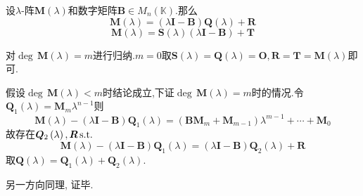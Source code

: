\begin{green}
\begin{lemma}[带余除法]\label{lem:矩阵多项式的带余除法}
    设$\lambda$-阵$\bm{M}\left(\lambda\right)$和数字矩阵$\bm{B}\in M_n\left(\mathbb{K}\right)$.那么
    \[
    \bm{M}\left(\lambda\right)=\left(\lambda\bm{I}-\bm{B}\right)\bm{Q}\left(\lambda\right)+\bm{R}
    \]
    \[
    \bm{M}\left(\lambda\right)=\bm{S}\left(\lambda\right)\left(\lambda\bm{I}-\bm{B}\right)+\bm{T}
    \]
\end{lemma}
\begin{Proof}
对$\deg\,\bm{M}\left(\lambda\right)=m$进行归纳.$m=0$取$\bm{S}\left(\lambda\right)=\bm{Q}\left(\lambda\right)=\bm{O},\bm{R}=\bm{T}=\bm{M}\left(\lambda\right)$即可.

假设$\deg\,\bm{M}\left(\lambda\right)<m$时结论成立,下证$\deg\,\bm{M}\left(\lambda\right)=m$时的情况.令$\bm{Q}_1\left(\lambda\right)=\bm{M}_m\lambda^{n-1}$则
\[
\bm{M}\left(\lambda\right)-\left(\lambda\bm{I}-\bm{B}\right)\bm{Q}_1\left(\lambda\right)=\left(\bm{B}\bm{M}_m+\bm{M}_{m-1}\right)\lambda^{m-1}+\cdots+\bm{M}_0
\]故存在$\bm{Q}_2\left(\lambda\right),\bm{R}\,\textup{s.t.}$
\[
\bm{M}\left(\lambda\right)-\left(\lambda\bm{I}-\bm{B}\right)\bm{Q}_1\left(\lambda\right)=\left(\lambda\bm{I}-\bm{B}\right)\bm{Q}_2\left(\lambda\right)+\bm{R}
\]取$\bm{Q}\left(\lambda\right)=\bm{Q}_1\left(\lambda\right)+\bm{Q}_2\left(\lambda\right).$

另一方向同理,
证毕.
\end{Proof}
\end{green}
